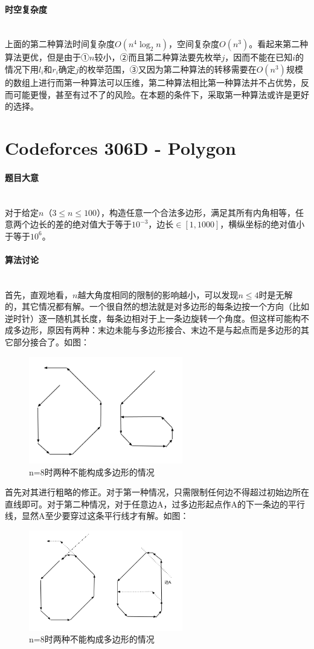 \documentclass[UTF8]{ctexart}
\newcommand{\myparagraph}[1]{\paragraph{#1}\mbox{}\\}
\theoremstyle{nonumberplain}
\begin{document}
		\myparagraph{时空复杂度}
		
			上面的第二种算法时间复杂度$O(n^4\log_2n)$，空间复杂度$O(n^3)$。看起来第二种算法更优，但是由于①$n$较小，②而且第二种算法要先枚举$j$，因而不能在已知$i$的情况下用$l_i$和$r_i$确定$j$的枚举范围，③又因为第二种算法的转移需要在$O(n^3)$规模的数组上进行而第一种算法可以压维，第二种算法相比第一种算法并不占优势，反而可能更慢，甚至有过不了的风险。在本题的条件下，采取第一种算法或许是更好的选择。
	
	\section{Codeforces 306D - Polygon}
	
		\myparagraph{题目大意}
		
			对于给定$n$（$3 \leq n \leq 100$），构造任意一个合法多边形，满足其所有内角相等，任意两个边长的差的绝对值大于等于$10^{-3}$，边长$\in [1,1000]$，横纵坐标的绝对值小于等于$10^6$。
		
		\myparagraph{算法讨论}
		
			首先，直观地看，$n$越大角度相同的限制的影响越小，可以发现$n \leq 4$时是无解的，其它情况都有解。一个很自然的想法就是对多边形的每条边按一个方向（比如逆时针）逐一随机其长度，每条边相对于上一条边旋转一个角度。但这样可能构不成多边形，原因有两种：末边未能与多边形接合、末边不是与起点而是多边形的其它部分接合了。如图：
			
			\begin{figure}[ht]
				\centering
				\includegraphics[width=0.6\textwidth]{fig306d_1.png}
				\caption{n=8时两种不能构成多边形的情况}
			\end{figure}
			
			首先对其进行粗略的修正。对于第一种情况，只需限制任何边不得超过初始边所在直线即可。对于第二种情况，对于任意边A，过多边形起点作A的下一条边的平行线，显然A至少要穿过这条平行线才有解。如图：
			
			\begin{figure}[ht]
				\centering
				\includegraphics[width=0.6\textwidth]{fig306d_2.png}
				\caption{n=8时两种不能构成多边形的情况}
			\end{figure}
			
\end{document}
